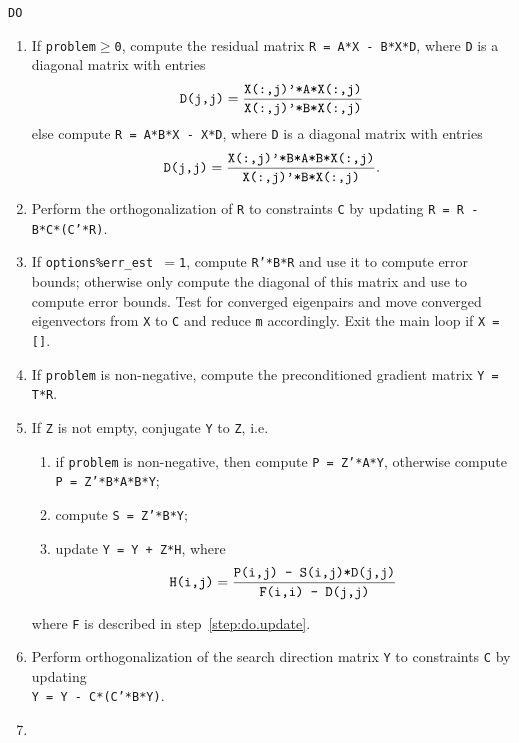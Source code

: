 \begin{itemize}
{\tt DO}
\begin{enumerate}
%
\item
\label{step:do.R}
If {\tt problem$\ge$0}, compute the residual matrix
{\tt R = A*X - B*X*D},
where {\tt D} is a  diagonal matrix with entries
%
\begin{equation}
\label{rq}
\mbox{\tt D(j,j)}=
\frac{\mbox{\tt X(:,j)'*A*X(:,j)}}
{\mbox{\tt X(:,j)'*B*X(:,j)}}
\end{equation}
%
else compute {\tt R = A*B*X - X*D},
where {\tt D} is a diagonal matrix with entries
%
\begin{equation}
\label{rq.AB}
\mbox{\tt D(j,j)}=
\frac{\mbox{\tt X(:,j)'*B*A*B*X(:,j)}}
{\mbox{\tt X(:,j)'*B*X(:,j)}}.
\end{equation}
%
\item
\label{step:do.ortho.R}
Perform the orthogonalization of {\tt R} 
to constraints {\tt C} by updating
{\tt R = R - B*C*(C'*R)}.
%
\item
\label{step:do.save}
If {\tt options\%err\_est $= $1},  compute {\tt R'*B*R}
and use it to compute error bounds;
otherwise only compute the diagonal of this matrix
and use to compute error bounds.
Test for converged eigenpairs
and move converged eigenvectors from {\tt X} to {\tt C}
and reduce {\tt m} accordingly.
Exit the main loop if {\tt X = []}.
%
\item
If {\tt problem} is non-negative,
compute the preconditioned gradient
matrix {\tt Y = T*R}.
%
\item
\label{step:do.JC}
If {\tt Z} is not empty, conjugate {\tt Y} to {\tt Z}, i.e.
%
\begin{enumerate}
\item 
if {\tt problem} is non-negative,
then compute {\tt P = Z'*A*Y}, 
otherwise compute {\tt P = Z'*B*A*B*Y};
\item
compute {\tt S = Z'*B*Y};
\item
update {\tt Y = Y + Z*H},
where
\begin{equation}
\label{JC}
\mbox{\tt H(i,j)}=
\frac{\mbox{\tt P(i,j) - S(i,j)*D(j,j)}}
{\mbox{\tt F(i,i) - D(j,j)}}
\end{equation}
\end{enumerate}
where {\tt F} is described in step~\ref{step:do.update}.
%
\item
\label{step:do.ortho.Y}
Perform orthogonalization of the search direction matrix {\tt Y} 
to constraints {\tt C} by updating\\
{\tt Y = Y - C*(C'*B*Y)}.
%
\item
\label{step:do.cleanup.Y}

\end{enumerate}
\end{itemize}
